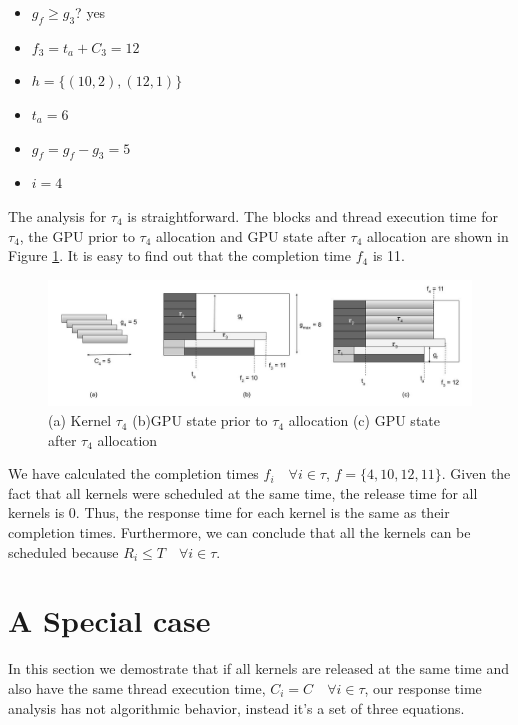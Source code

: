 \documentclass[
  12pt,
  a4paperpaper,
]{report}
\providecommand{\tightlist}{%
  \setlength{\itemsep}{0pt}\setlength{\parskip}{0pt}}
\begin{document}
\begin{itemize}
\tightlist
\item
  \(g_f \geq g_3\)? yes
\item
  \(f_3 = t_a + C_3 = 12\)
\item
  \(h = \{ (10,2),(12,1) \}\)
\item
  \(t_a = 6\)
\item
  \(g_f = g_f - g_3 = 5\)
\item
  \(i = 4\)
\end{itemize}

The analysis for \(\tau_4\) is straightforward. The blocks and thread
execution time for \(\tau_4\), the GPU prior to \(\tau_4\) allocation
and GPU state after \(\tau_4\) allocation are shown in Figure
\ref{img:ex_4}. It is easy to find out that the completion time \(f_4\)
is 11.

\begin{figure}
\centering
\includegraphics{source/figures/ex_4.jpg}
\caption{(a) Kernel \(\tau_4\) (b)GPU state prior to \(\tau_4\)
allocation (c) GPU state after \(\tau_4\) allocation \label{img:ex_4}}
\end{figure}

We have calculated the completion times
\(f_i \quad \forall i \in \tau\), \(f = \{4,10,12,11\}\). Given the fact
that all kernels were scheduled at the same time, the release time for
all kernels is 0. Thus, the response time for each kernel is the same as
their completion times. Furthermore, we can conclude that all the
kernels can be scheduled because
\(R_i \leq T \quad \forall i \in \tau\).

\hypertarget{a-special-case}{%
\section{A Special case}\label{a-special-case}}

In this section we demostrate that if all kernels are released at the
same time and also have the same thread execution time,
\(C_i = C \quad \forall i \in \tau\), our response time analysis has not
algorithmic behavior, instead it's a set of three equations.
\end{document}
